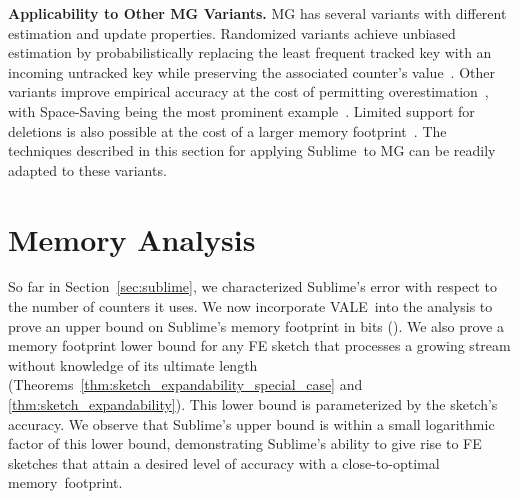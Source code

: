 \documentclass[sigconf]{acmart}
\newcommand{\sketch}{Sublime}
\newcommand{\counterencodingabbrv}{VALE}
\begin{document}
\textbf{Applicability to Other MG Variants.}
MG has several variants with different estimation and update properties.
Randomized variants achieve unbiased estimation by probabilistically replacing the least frequent tracked key with an incoming untracked key while preserving the associated counter's value~\cite{UnbiasedSpaceSaving,WavingSketch}.
Other variants improve empirical accuracy at the cost of permitting overestimation~\cite{HeavyGuardian,HeavyKeeper}, with Space-Saving being the most prominent example~\cite{SpaceSaving}.
Limited support for deletions is also possible at the cost of a larger memory footprint~\cite{SpaceSavingBoundedDeletes}.
The techniques described in this section for applying \sketch\ to MG can be readily adapted to these variants.


\section{Memory Analysis}\label{sec:memory_analysis}
So far in Section~\ref{sec:sublime}, we characterized
\sketch's error with respect to the number of counters it uses. We now
incorporate \counterencodingabbrv\ into the analysis to prove an upper bound on
\sketch's memory footprint in bits
(). We also prove a memory footprint
lower bound for any FE sketch that processes a growing stream without knowledge
of its ultimate length (Theorems~\ref{thm:sketch_expandability_special_case}
and \ref{thm:sketch_expandability}). This lower
bound is parameterized by the sketch's accuracy. We observe that \sketch's
upper bound is within a small logarithmic factor of this lower bound,
demonstrating \sketch's ability to give rise to FE sketches that attain a
desired level of accuracy with a close-to-optimal memory~footprint.
\end{document}
